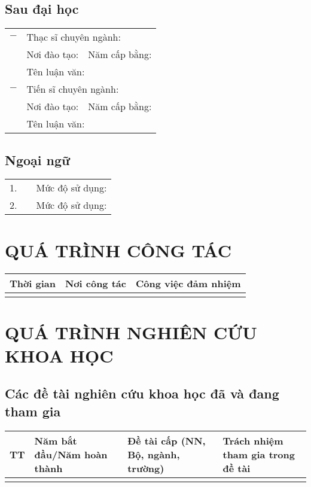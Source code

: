 \documentclass[a4paper, 11pt]{article}
\begin{document}
\subsection{Sau đại học}

\begin{tabularx}{\columnwidth}{p{0.1cm}p{12cm}X}
$-$ & \multicolumn{2}{l}{Thạc sĩ chuyên ngành: }\\
 & Nơi đào tạo:  & Năm cấp bằng: \\
 & \multicolumn{2}{l}{Tên luận văn: }\\
$-$ & \multicolumn{2}{l}{Tiến sĩ chuyên ngành: }\\
 & Nơi đào tạo: & Năm cấp bằng: \\
 & \multicolumn{2}{l}{Tên luận văn: }\\
\end{tabularx}

\subsection{Ngoại ngữ}

\begin{tabularx}{\columnwidth}{p{0.1cm}XX}
1. &  & Mức độ sử dụng: \\
2. &  & Mức độ sử dụng: \\
\end{tabularx}

\section{QUÁ TRÌNH CÔNG TÁC}

\begin{tabularx}{\columnwidth}{|X|X|X|}
\hline
Thời gian & Nơi công tác & Công việc đảm nhiệm \\
\hline
& & \\
\hline
\end{tabularx}

\section{QUÁ TRÌNH NGHIÊN CỨU KHOA HỌC}

\subsection{Các đề tài nghiên cứu khoa học đã và đang tham gia}

\begin{tabularx}{\columnwidth}{|p{0.5cm}|X|X|X|}
\hline
TT & Năm bắt đầu/Năm hoàn thành & Đề tài cấp (NN, Bộ, ngành, trường) & Trách nhiệm tham gia trong đề tài \\
\hline
& & & \\
\hline
\end{tabularx}
\end{document}
